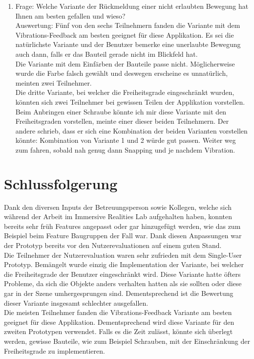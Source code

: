 \begin{enumerate} [itemsep=2pt]
	\item Frage: Welche Variante der Rückmeldung einer nicht erlaubten Bewegung hat Ihnen am besten gefallen und wieso? \\
	Auswertung: Fünf von den sechs Teilnehmern fanden die Variante mit dem Vibrations-Feedback am besten geeignet für diese Applikation. Es sei die natürlichste Variante und der Benutzer bemerke eine unerlaubte Bewegung auch dann, falls er das Bauteil gerade nicht im Blickfeld hat. \\
	Die Variante mit dem Einfärben der Bauteile passe nicht. Möglicherweise wurde die Farbe falsch gewählt und deswegen erscheine es unnatürlich, meinten zwei Teilnehmer. \\
	Die dritte Variante, bei welcher die Freiheitsgrade eingeschränkt wurden, könnten sich zwei Teilnehmer bei gewissen Teilen der Applikation vorstellen. \grqq Beim Anbringen einer Schraube könnte ich mir diese Variante mit den Freiheitsgraden vorstellen\grqq{}, meinte einer dieser beiden Teilnehmern. Der andere schrieb, dass er sich eine Kombination der beiden Varianten vorstellen könnte: \grqq Kombination von Variante 1 und 2 würde gut passen. Weiter weg zum fahren, sobald nah genug dann Snapping und je nachdem Vibration.\grqq{}
\end{enumerate}

\pagebreak
\section{Schlussfolgerung}
\label{ch:schlussfolgerung_t1}
Dank den diversen Inputs der Betreuungsperson sowie Kollegen, welche sich während der Arbeit im Immersive Realities Lab aufgehalten haben, konnten bereits sehr früh Features angepasst oder gar hinzugefügt werden, wie das zum Beispiel beim Feature Baugruppen der Fall war. Dank diesen Anpassungen war der Prototyp bereits vor den Nutzerevaluationen auf einem guten Stand. \\

\noindent Die Teilnehmer der Nutzerevaluation waren sehr zufrieden mit dem Single-User Prototyp. Bemängelt wurde einzig die Implementation der Variante, bei welcher die Freiheitsgrade der Benutzer eingeschränkt wird. Diese Variante hatte öfters Probleme, da sich die Objekte anders verhalten hatten als sie sollten oder diese gar in der Szene umhergesprungen sind. Dementsprechend ist die Bewertung dieser Variante insgesamt schlechter ausgefallen. \\

\noindent Die meisten Teilnehmer fanden die Vibrations-Feedback Variante am besten geeignet für diese Applikation. Dementsprechend wird diese Variante für den zweiten Prototypen verwendet. Falls es die Zeit zulässt, könnte sich überlegt werden, gewisse Bauteile, wie zum Beispiel Schrauben, mit der Einschränkung der Freiheitsgrade zu implementieren.


